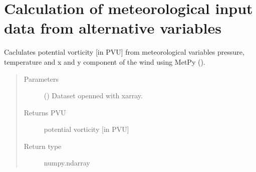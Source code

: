 \documentclass[a4paper,11pt,english]{sphinxmanual}
\begin{document}
\section{Calculation of meteorological input data from alternative variables}
\label{\detokenize{modules:module-envlib.calc_altrv_vars}}\label{\detokenize{modules:calculation-of-meteorological-input-data-from-alternative-variables}}

\begin{fulllineitems}
\label{\detokenize{modules:envlib.calc_altrv_vars.get_pvu}}
Caclulates potential vorticity {[}in PVU{]} from meteorological variables pressure, temperature and x and y component of the wind using MetPy ().
\begin{quote}\begin{description}
\item[{Parameters}] \leavevmode
{} () \textendash{} Dataset openned with xarray.

\item[{Returns PVU}] \leavevmode
potential vorticity {[}in PVU{]}

\item[{Return type}] \leavevmode
numpy.ndarray

\end{description}\end{quote}

\end{fulllineitems}

\end{document}
